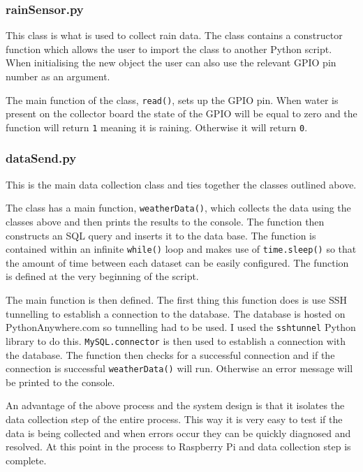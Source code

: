\documentclass[10pt,a4paper]{article}
\begin{document}
\subsubsection{rainSensor.py}
This class is what is used to collect rain data. The class contains a constructor function which allows the user to import the class to another Python script. When initialising the new object the user can also use the relevant GPIO pin number as an argument. 

The main function of the class, \texttt{read()}, sets up the GPIO pin. When water is present on the collector board the state of the GPIO will be equal to zero and the function will return \texttt{1} meaning it is raining. Otherwise it will return \texttt{0}. 

\subsubsection{dataSend.py}
This is the main data collection class and ties together the classes outlined above. 

The class has a main function, \texttt{weatherData()}, which collects the data using the classes above and then prints the results to the console. The function then constructs an SQL query and inserts it to the data base. The function is contained within an infinite \texttt{while()} loop and makes use of  \texttt{time.sleep()} so that the amount of time between each dataset can be easily configured. The function is defined at the very beginning of the script. 

The main function is then defined. The first thing this function does is use SSH tunnelling to establish a connection to the database. The database is hosted on PythonAnywhere.com so tunnelling had to be used. I used the \texttt{sshtunnel} Python library to do this. \texttt{MySQL.connector} is then used to establish a connection with the database. The function then checks for a successful connection and if the connection is successful \texttt{weatherData()} will run. Otherwise an error message will be printed to the console. 

An advantage of the above process and the system design is that it isolates the data collection step of the entire process. This way it is very easy to test if the data is being collected and when errors occur they can be quickly diagnosed and resolved. At this point in the process to Raspberry Pi and data collection step is complete. 
\end{document}
